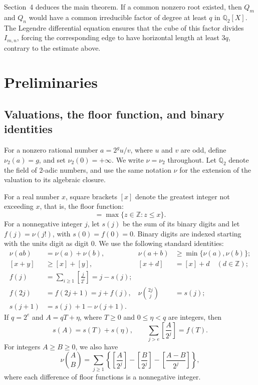 \documentclass[11pt,a4paper]{article}
\numberwithin{equation}{section}
\theoremstyle{definition}
\begin{document}
Section~4 deduces the main theorem. If a common nonzero root existed, then $Q_m$ and $Q_n$ would have a common irreducible factor of degree at least $q$ in $\mathbb{Q}_2[X]$. The Legendre differential equation ensures that the cube of this factor divides $I_{m,n}$, forcing the corresponding edge to have horizontal length at least $3q$, contrary to the estimate above.

\section{Preliminaries}

\subsection{Valuations, the floor function, and binary identities}

For a nonzero rational number $a=2^g u/v$, where $u$ and $v$ are odd,
define $\nu_2(a)=g$, and set $\nu_2(0)=+\infty$. We write $\nu=\nu_2$
throughout. Let $\mathbb{Q}_2$ denote the field of $2$-adic numbers, and
use the same notation $\nu$ for the extension of the valuation to its
algebraic closure.

For a real number $x$, square brackets $[x]$ denote the greatest integer
not exceeding $x$, that is, the floor function:
\begin{equation}
 [x]=\max\{z\in\mathbb{Z}:z\le x\}.
 \label{eq:2-1}
\end{equation}
For a nonnegative integer $j$, let $s(j)$ be the sum of its binary digits
and let $f(j)=\nu(j!)$, with $s(0)=f(0)=0$. Binary digits are indexed
starting with the units digit as digit $0$. We use the following
standard identities:
\begin{align}
 \nu(ab)&=\nu(a)+\nu(b),
 &\nu(a+b)&\ge\min\{\nu(a),\nu(b)\};
 \label{eq:2-2}\\
 [x+y]&\ge[x]+[y],
 &[x+d]&=[x]+d\quad(d\in\mathbb{Z});
 \label{eq:2-3}\\
 f(j)&=\sum_{i\ge1}\left[\frac{j}{2^i}\right]=j-s(j);
 &&\label{eq:2-4}\\
 f(2j)&=f(2j+1)=j+f(j),
 &\nu\binom{2j}{j}&=s(j);
 \label{eq:2-5}\\
 s(j+1)&=s(j)+1-\nu(j+1).
 &&\label{eq:2-6}
\end{align}
If $q=2^e$ and $A=qT+\eta$, where $T\ge0$ and $0\le\eta<q$ are integers,
then
\begin{equation}
 s(A)=s(T)+s(\eta),\qquad
 \sum_{j>e}\left[\frac{A}{2^j}\right]=f(T).
 \label{eq:2-7}
\end{equation}
For integers $A\ge B\ge0$, we also have
\begin{equation}
 \nu\binom{A}{B}
 =\sum_{j\ge1}\left\{
 \left[\frac{A}{2^j}\right]
 -\left[\frac{B}{2^j}\right]
 -\left[\frac{A-B}{2^j}\right]\right\},
 \label{eq:2-8}
\end{equation}
where each difference of floor functions is a nonnegative integer.
\end{document}

